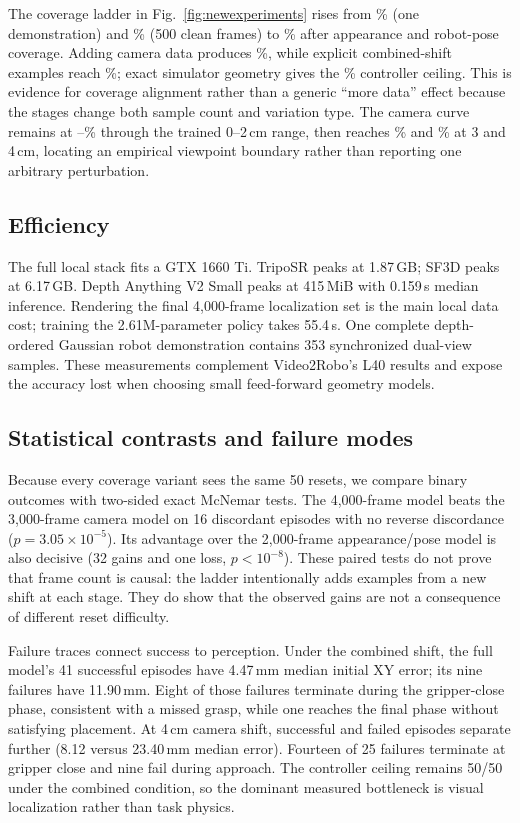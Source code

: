 \documentclass[10pt,twocolumn,letterpaper]{article}
\begin{document}
The coverage ladder in Fig.~\ref{fig:newexperiments} rises from
\CoverageOneDemo\% (one demonstration) and \CoverageCleanFiveHundred\% (500 clean
frames) to \CoverageAppearancePoseTwoThousand\% after appearance and robot-pose
coverage. Adding camera data produces \CoveragePlusCameraThreeThousand\%, while explicit
combined-shift examples reach \CoveragePlusCombinedFourThousand\%; exact simulator
geometry gives the \CoverageOracle\% controller ceiling. This is evidence for
coverage alignment rather than a generic ``more data'' effect because the stages
change both sample count and variation type. The camera curve remains at
\CameraZerocm--\CameraTwocm\% through the trained 0--2\,cm range, then reaches
\CameraThreecm\% and \CameraFourcm\% at 3 and 4\,cm, locating an empirical
viewpoint boundary rather than reporting one arbitrary perturbation.

\subsection{Efficiency}
The full local stack fits a GTX 1660 Ti. TripoSR peaks at 1.87\,GB; SF3D peaks at
6.17\,GB. Depth Anything V2 Small peaks at 415\,MiB with 0.159\,s median
inference. Rendering the final 4,000-frame localization set is the main local
data cost; training the 2.61M-parameter policy takes 55.4\,s. One complete
depth-ordered Gaussian robot demonstration contains 353 synchronized dual-view
samples. These measurements complement Video2Robo's L40 results and expose the
accuracy lost when choosing small feed-forward geometry models.

\subsection{Statistical contrasts and failure modes}
Because every coverage variant sees the same 50 resets, we compare binary
outcomes with two-sided exact McNemar tests. The 4,000-frame model beats the
3,000-frame camera model on 16 discordant episodes with no reverse discordance
($p=3.05\times10^{-5}$). Its advantage over the 2,000-frame appearance/pose
model is also decisive (32 gains and one loss, $p<10^{-8}$). These paired tests
do not prove that frame count is causal: the ladder intentionally adds examples
from a new shift at each stage. They do show that the observed gains are not a
consequence of different reset difficulty.

Failure traces connect success to perception. Under the combined shift, the
full model's 41 successful episodes have 4.47\,mm median initial XY error; its
nine failures have 11.90\,mm. Eight of those failures terminate during the
gripper-close phase, consistent with a missed grasp, while one reaches the final
phase without satisfying placement. At 4\,cm camera shift, successful and failed
episodes separate further (8.12 versus 23.40\,mm median error). Fourteen of 25
failures terminate at gripper close and nine fail during approach. The controller
ceiling remains 50/50 under the combined condition, so the dominant measured
bottleneck is visual localization rather than task physics.
\end{document}
